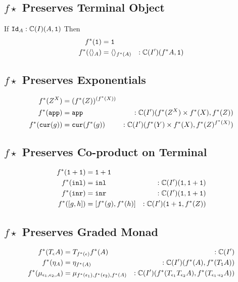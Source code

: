 \documentclass{report}
\begin{document}
\subsection{$f\star$ Preserves Terminal Object}
If $\texttt{Id}_{A}:\mathbb{C}(I)(A, \texttt{1})$
Then 
\begin{align*}
    f^*(\texttt{1}) & = \texttt{1} \\
    f^*(\langle\rangle_{A}) & = \langle\rangle_{f^*(A)}&:\mathbb{C}(I')(f^* A, \texttt{1})\\
\end{align*}

\subsection{$f\star$ Preserves Exponentials}
\begin{align*}
    f^*(Z^X) & = (f^*(Z))^{(f^*(X))}\\
     f^*(\texttt{app}) &= \texttt{app}&:\mathbb{C}(I')(f^*(Z^X)\times f^*(X), f^*(Z))\\
     f^*(\texttt{cur}(g)) &= \texttt{cur}(f^*(g))&:\mathbb{C}(I')(f^*(Y)\times f^*(X), f^*(Z)^{f^*(X)})
\end{align*}

\subsection{$f\star$ Preserves Co-product on Terminal}

\begin{align*}
    f^*(\texttt{1}+\texttt{1}) &= \texttt{1}+\texttt{1}\\
    f^*(\texttt{inl})  &= \texttt{inl}&:\mathbb{C}(I')(\texttt{1}, \texttt{1}+\texttt{1}) \\
    f^*(\texttt{inr}) &= \texttt{inr}&:\mathbb{C}(I')(\texttt{1}, \texttt{1}+\texttt{1}) \\
    f^*([g, h]) &= [f^*(g), f^*(h)]&:\mathbb{C}(I')(\texttt{1}+\texttt{1}, f^*(Z))
\end{align*}

\subsection{$f\star$ Preserves Graded Monad}
\begin{align*}
    f^*(T_{\epsilon}{A}) &= T_{f^*(\epsilon)}{f^*(A)}&:\mathbb{C}(I')\\    
    f^*(\eta_{A}) &= \eta_{f^*(A)}&:\mathbb{C}(I')(f^*(A), f^*(T_{\texttt{1}}{A}))\\
    f^*(\mu_{\epsilon_1, \epsilon_2, A}) &= \mu_{f^*(\epsilon_1), f^*(\epsilon_2), f^*(A)}&:\mathbb{C}(I')(f^*(T_{\epsilon_1}{T_{\epsilon_2}{A}}), f^*(T_{\epsilon_1\cdot\epsilon_2}{A}))\\
\end{align*}
\end{document}
